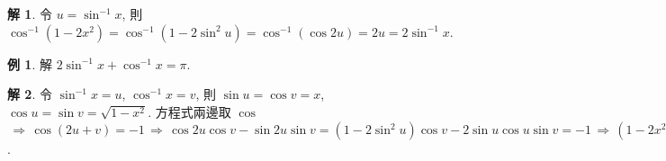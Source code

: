 \documentclass[12pt]{extarticle}
\newcommand{\ds}{\displaystyle}
\newcommand{\ie}{\,\Longrightarrow\,}
\theoremstyle{definition}
\newtheorem*{ex}{例}
\newtheorem*{sol}{解}
\newcommand{\myline}{\noindent\makebox[\linewidth]{\rule{\paperwidth}{0.4pt}}}
\begin{document}
\begin{sol}
  令 $\ds u = \sin^{-1}x$, 則 $\ds\cos^{-1}(1 - 2x^2) = \cos^{-1}(1 - 2\sin^2u) = \cos^{-1}(\cos 2u) = 2u = 2\sin^{-1}x$. 
\end{sol}

\begin{ex}
  解 $\ds2\sin^{-1} x + \cos^{-1}x = \pi$. 
\end{ex}

\begin{sol}
  令 $\ds\sin^{-1}x = u$, $\ds\cos^{-1}x = v$, 則 $\ds\sin u = \cos v = x$, $\ds\cos u = \sin v = \sqrt{1 - x^2}$. 方程式兩邊取 $\cos$ $\ds\ie\cos(2u + v) = -1 \ie \cos2u\cos v - \sin2u\sin v = (1 - 2\sin^2u)\cos v - 2\sin u\cos u\sin v = -1 \ie (1 - 2x^2)x - 2 x(1 - x^2) = -1 \ie x = 1$. 
\end{sol}

\myline

%
%
\end{document}
